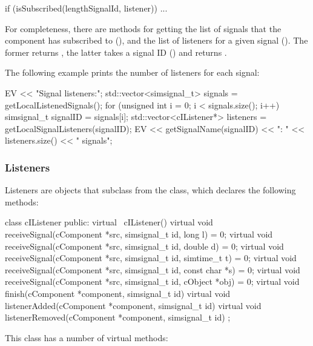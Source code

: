 \begin{cpp}
if (isSubscribed(lengthSignalId, listener))
{
    ...
}
\end{cpp}

For completeness, there are methods for getting the list of signals
that the component has subscribed to (),
and the list of listeners for a given signal ().
The former returns , the latter takes
a signal ID () and returns .

The following example prints the number of listeners for each signal:

\begin{cpp}
EV << "Signal listeners:\n";
std::vector<simsignal_t> signals = getLocalListenedSignals();
for (unsigned int i = 0; i < signals.size(); i++) {
    simsignal_t signalID = signals[i];
    std::vector<cIListener*> listeners = getLocalSignalListeners(signalID);
    EV << getSignalName(signalID) << ": " << listeners.size() << " signals\n";
}
\end{cpp}

\subsubsection{Listeners}

Listeners are objects that subclass from the  class, which
declares the following methods:

\begin{cpp}
class cIListener
{
  public:
    virtual ~cIListener() {}
    virtual void receiveSignal(cComponent *src, simsignal_t id, long l) = 0;
    virtual void receiveSignal(cComponent *src, simsignal_t id, double d) = 0;
    virtual void receiveSignal(cComponent *src, simsignal_t id, simtime_t t) = 0;
    virtual void receiveSignal(cComponent *src, simsignal_t id, const char *s) = 0;
    virtual void receiveSignal(cComponent *src, simsignal_t id, cObject *obj) = 0;
    virtual void finish(cComponent *component, simsignal_t id) {}
    virtual void listenerAdded(cComponent *component, simsignal_t id) {}
    virtual void listenerRemoved(cComponent *component, simsignal_t id) {}
};
\end{cpp}

This class has a number of virtual methods:

